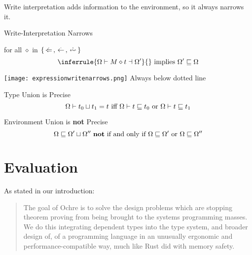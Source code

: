 \documentclass[12pt,twoside]{report}
\begin{document}
Write interpretation adds information to the environment, so it always narrows it.

\begin{Property}{Write-Interpretation Narrows}{} %
  \begin{minipage}{0.6\textwidth}
    \centering
    for all $\diamond$ in $\{ \writearrowabs, \narrowarrowabs, \erasedwritearrow \}$
    \[
      \inferrule{
        \Omega \vdash M \diamond t \dashv \Omega'
      }{}
      \text{   implies   }
      \Omega' \subtype \Omega
    \]
  \end{minipage}
  \begin{minipage}{0.3\textwidth}
    \centering
    \texttt{[image: expressionwritenarrows.png]}
    Always below dotted line
  \end{minipage}
\end{Property}
\label{theorem:expressionwritenarrows}

\begin{Property}{Type Union is Precise}{}
  \[
    \Omega \vdash t_0 \sqcup t_1 = t
    \text{   iff   }
    \Omega \vdash t \sqsubseteq t_0
    \text{   or   } 
    \Omega \vdash t \sqsubseteq t_1
  \]
\end{Property}
\label{theorem:precisetypeunion}

\begin{Property}{Environment Union is \textbf{not} Precise}{}
  \[
    \Omega \sqsubseteq \Omega' \sqcup \Omega''
    \text{   \textbf{not} if and only if   }
    \Omega \sqsubseteq \Omega'
    \text{   or   } 
    \Omega \sqsubseteq \Omega''
  \]
\end{Property}
\label{theorem:inpreciseenvunion}


\chapter{Evaluation}
\label{chapter:evaluation}
As stated in our introduction:

\begin{quote}
  The goal of Ochre is to solve the design problems which are stopping theorem proving from being brought to the systems programming masses. We do this integrating dependent types into the type system, and broader design of, of a programming language in an unusually ergonomic and performance-compatible way, much like Rust did with memory safety.
\end{quote}
\end{document}

